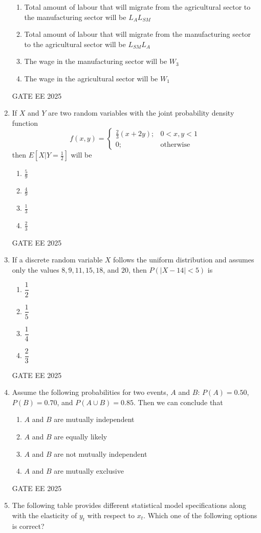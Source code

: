 \documentclass[journal,12pt,onecolumn]{IEEEtran}
\theoremstyle{remark}
\begin{document}
\begin{enumerate}
\vspace{0.2cm}
\begin{enumerate}[label=(\Alph*)]
    \item Total amount of labour that will migrate from the agricultural sector to the manufacturing sector will be $L_A L_{SM}$
    \item Total amount of labour that will migrate from the manufacturing sector to the agricultural sector will be $L_{SM} L_A$
    \item The wage in the manufacturing sector will be $W_3$
    \item The wage in the agricultural sector will be $W_1$
\end{enumerate}
GATE EE 2025\\
\item If $X$ and $Y$ are two random variables with the joint probability density function
\[
f(x, y) =
\begin{cases}
\frac{2}{3}(x + 2y); & 0 < x, y < 1 \\
0; & \text{otherwise}
\end{cases}
\]
then $E\left[X|Y=\frac{1}{2}\right]$ will be
\begin{enumerate}[label=(\Alph*)]
    \item $\frac{5}{9}$
    \item $\frac{4}{9}$
    \item $\frac{1}{3}$
    \item $\frac{2}{3}$
\end{enumerate}
GATE EE 2025\\
\item If a discrete random variable $X$ follows the uniform distribution and assumes only the values $8, 9, 11, 15, 18$, and $20$, then $P(|X - 14| < 5)$ is
\begin{enumerate}[label=(\Alph*)]
    \item $\dfrac{1}{2}$
    \item $\dfrac{1}{5}$
    \item $\dfrac{1}{4}$
    \item $\dfrac{2}{3}$
\end{enumerate}
GATE EE 2025\\
\item Assume the following probabilities for two events, $A$ and $B$: $P(A) = 0.50$, $P(B) = 0.70$, and $P(A \cup B) = 0.85$. Then we can conclude that
\begin{enumerate}[label=(\Alph*)]
    \item $A$ and $B$ are mutually independent
    \item $A$ and $B$ are equally likely
    \item $A$ and $B$ are not mutually independent
    \item $A$ and $B$ are mutually exclusive
\end{enumerate}
GATE EE 2025\\
\item The following table provides different statistical model specifications along with the elasticity of $y_t$ with respect to $x_t$. Which one of the following options is correct?


\end{enumerate}
\end{document}
